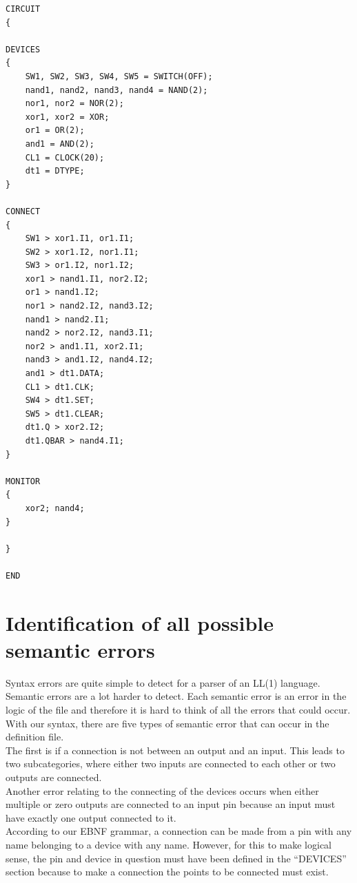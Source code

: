 \documentclass[10pt]{article}
\begin{document}
\begin{verbatim}
CIRCUIT
{

DEVICES
{
    SW1, SW2, SW3, SW4, SW5 = SWITCH(OFF);
    nand1, nand2, nand3, nand4 = NAND(2);
    nor1, nor2 = NOR(2);
    xor1, xor2 = XOR;
    or1 = OR(2);
    and1 = AND(2);
    CL1 = CLOCK(20);
    dt1 = DTYPE;
}

CONNECT
{
    SW1 > xor1.I1, or1.I1;
    SW2 > xor1.I2, nor1.I1;
    SW3 > or1.I2, nor1.I2;
    xor1 > nand1.I1, nor2.I2;
    or1 > nand1.I2;
    nor1 > nand2.I2, nand3.I2;
    nand1 > nand2.I1;
    nand2 > nor2.I2, nand3.I1;
    nor2 > and1.I1, xor2.I1;
    nand3 > and1.I2, nand4.I2;
    and1 > dt1.DATA;
    CL1 > dt1.CLK;
    SW4 > dt1.SET;
    SW5 > dt1.CLEAR;
    dt1.Q > xor2.I2;
    dt1.QBAR > nand4.I1;
}

MONITOR
{
    xor2; nand4;
}

}

END
\end{verbatim}

\newpage
\section{Identification of all possible semantic errors}

Syntax errors are quite simple to detect for a parser of an LL(1) language. Semantic errors are a lot harder to detect. Each semantic error is an error in the logic of the file and therefore it is hard to think of all the errors that could occur. With our syntax, there are five types of semantic error that can occur in the definition file. \\

The first is if a connection is not between an output and an input. This leads to two subcategories, where either two inputs are connected to each other or two outputs are connected. \\

Another error relating to the connecting of the devices occurs when either multiple or zero outputs are connected to an input pin because an input must have exactly one output connected to it. \\

According to our EBNF grammar, a connection can be made from a pin with any name belonging to a device with any name. However, for this to make logical sense, the pin and device in question must have been defined in the “DEVICES” section because to make a connection the points to be connected must exist.\\
\end{document}
